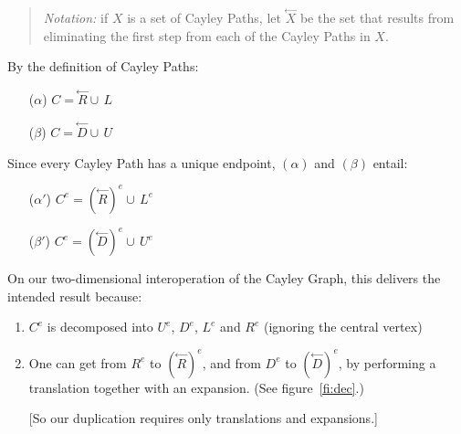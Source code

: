 \documentclass[12pt]{extarticle}
\begin{document}
\begin{quote}
\emph{Notation:} if \(X\) is a set of Cayley Paths, let \(\stackrel{\leftarrow}{X}\) be the set that results from  eliminating the first step from each of the Cayley Paths in \(X\).


\end{quote}
By the definition of Cayley Paths:
\begin{enumerate}
\item[(\(\alpha\))] \(C =  \stackrel{\leftarrow}{R} \cup \, L\)

\item[(\(\beta\))] \(C =  \stackrel{\leftarrow}{D} \cup \, U\)

\end{enumerate}
Since every Cayley Path has a unique endpoint, \((\alpha)\) and \((\beta)\) entail:
\begin{enumerate}
\item[(\(\alpha'\))] \(C^e =  \left(\stackrel{\leftarrow}{R}\right)^e \cup \, L^e\)

\item[(\(\beta'\))] \(C^e =  \left(\stackrel{\leftarrow}{D}\right)^e \cup \, U^e\)
\end{enumerate}
On our two-dimensional interoperation of the Cayley Graph, this delivers the intended result because:

\begin{enumerate}

\item  \(C^e\) is decomposed into \(U^e\), \(D^e\), \(L^e\) and \(R^e\) (ignoring the central vertex)

\item One can get from \(R^e\) to \(\left(\stackrel{\leftarrow}{R}\right)^e\), and from \(D^e\) to \(\left(\stackrel{\leftarrow}{D}\right)^e\), by performing a translation together with an expansion. (See figure~\ref{fi:dec}.)

[So our duplication requires only translations and expansions.]


\end{enumerate}
\end{document}
